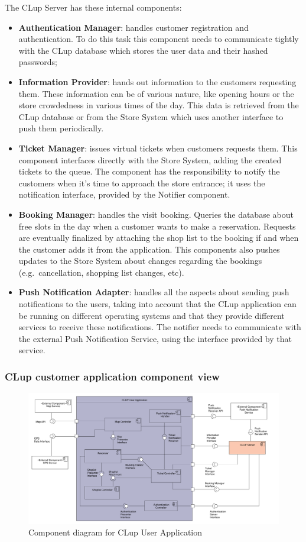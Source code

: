 The CLup Server has these internal components:
\begin{itemize}
    \item \textbf{Authentication Manager}: handles customer registration and authentication. To do this task this component needs to communicate tightly with the CLup database which stores the user data and their hashed passwords;
    \item \textbf{Information Provider}: hands out information to the customers requesting them. These information can be of various nature, like opening hours or the store crowdedness in various times of the day. This data is retrieved from the CLup database or from the Store System which uses another interface to push them periodically.
    \item \textbf{Ticket Manager}: issues virtual tickets when customers requests them. This component interfaces directly with the Store System, adding the created tickets to the queue. The component has the responsibility to notify the customers when it's time to approach the store entrance; it uses the notification interface, provided by the Notifier component.
    \item \textbf{Booking Manager}: handles the visit booking. Queries the database about free slots in the day when a customer wants to make a reservation. Requests are eventually finalized by attaching the shop list to the booking if and when the customer adds it from the application. This components also pushes updates to the Store System about changes regarding the bookings (e.g.~cancellation, shopping list changes, etc).
    \item \textbf{Push Notification Adapter}: handles all the aspects about sending push notifications to the users, taking into account that the CLup application can be running on different operating systems and that they provide different services to receive these notifications. The notifier needs to communicate with the external Push Notification Service, using the interface provided by that service.
\end{itemize}

\subsubsection{CLup customer application component view}
\begin{figure}[H]
    \includegraphics[width=\textwidth]{Images/UML_user_app_component.pdf}
    \caption{\label{fig:UML_comp_CLup_user_app}Component diagram for CLup User Application}
\end{figure}

